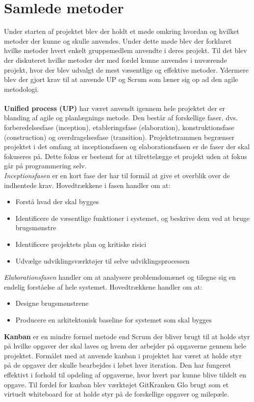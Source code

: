 \section{Samlede metoder} \label{sec:samlede metoder}
Under starten af projektet blev der holdt et møde omkring hvordan og hvilket metoder der kunne og skulle anvendes. Under dette møde blev der forklaret hvilke metoder hvert enkelt gruppemedlem anvendte i deres projekt. Til det blev der diskuteret hvilke metoder der med fordel kunne anvendes i nuværende projekt, hvor der blev udvalgt de mest væsentlige og effektive metoder. Ydermere blev der gjort krav til at anvende UP og Scrum som læner sig op ad den agile metodologi.  \\ \\
\textbf{ Unified process (UP)} har været anvendt igennem hele projektet der er blanding af agile og planlægnings metode. Den består af forskellige faser, dvs. forberedelsesfase (inception), etableringsfase (elaboration), konstruktionsfase (construction) og overdragelsesfase (transition). Projektetrammen begrænser projektet i det omfang at inceptionsfasen og elaborationsfasen er de faser der skal fokuseres på. Dette fokus er bestemt for at tilrettelægge et projekt uden at fokus går på programmering selv. \\ 
\emph{Inceptionsfasen} er en kort fase der har til formål at give et overblik over de indhentede krav. Hovedtrækkene i fasen handler om at:
\begin{itemize}
\item Forstå hvad der skal bygges
\item Identificere de væsentlige funktioner i systemet, og beskrive dem ved at bruge brugsmønstre
\item Identificere projektets plan og kritiske risici
\item Udvælge udviklingsværktøjer til selve udviklingsprocessen
\end{itemize}
\emph{Elaborationsfasen} handler om at analysere problemdomænet og tilegne sig en endelig forståelse af hele systemet. Hovedtrækkene handler om at: 
\begin{itemize}
\item Designe brugsmønstrene
\item Producere en arkitektonisk baseline for systemet som skal bygges
\end{itemize}
\textbf{Kanban} er en mindre formel metode end Scrum der bliver brugt til at holde styr på hvilke opgaver der skal laves og hvem der arbejder på opgaverne gennem hele projektet. Formålet med at anvende kanban i projektet har været at holde styr på de opgaver der skulle bearbejdes i løbet hver iteration. Den har fungeret effektivt i forhold til opdeling af opgaverne, hvor hvert par kunne blive tildelt en opgave. Til fordel for kanban blev værktøjet GitKranken Glo brugt som et virtuelt whiteboard for at holde styr på de forskellige opgaver og milepæle. \\
